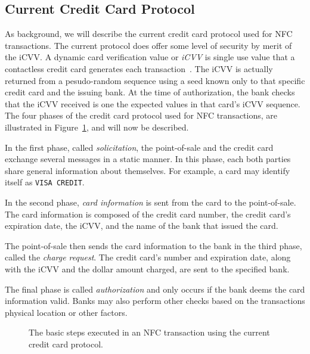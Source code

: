 \documentclass{sig-alternate}
\begin{document}
\subsection{Current Credit Card Protocol}
\label{sec:currentCC}
As background, we will describe the current credit card protocol used for NFC transactions. The current protocol does offer some level of security by merit of the iCVV. A dynamic card verification value or \textit{iCVV} is single use value that a contactless credit card generates each transaction~\cite{wiki:iCVV}. The iCVV is actually returned from a pesudo-random sequence using a seed known only to that specific credit card and the issuing bank. At the time of authorization, the bank checks that the iCVV received is one the expected values in that card's iCVV sequence. The four phases of the credit card protocol used for NFC transactions, are illustrated in Figure~\ref{fig:currentCC}, and will now be described.

In the first phase, called \textit{solicitation}, the point-of-sale and the credit card exchange several messages in a static manner. In this phase, each both parties share general information about themselves. For example, a card may identify itself as \texttt{VISA CREDIT}.

In the second phase, \textit{card information} is sent from the card to the point-of-sale. The card information is composed of the credit card number, the credit card's expiration date, the iCVV, and the name of the bank that issued the card.

The point-of-sale then sends the card information to the bank in the third phase, called the \textit{charge request}. The credit card's number and expiration date, along with the iCVV and the dollar amount charged, are sent to the specified bank.

The final phase is called \textit{authorization} and only occurs if the bank deems the card information valid. Banks may also perform other checks based on the transactions physical location or other factors.


\begin{figure}
\centering
{}
\caption{The basic steps executed in an NFC transaction using the current credit card protocol.
\cite{CC2016}}
\label{fig:currentCC}
\end{figure}
\end{document}
